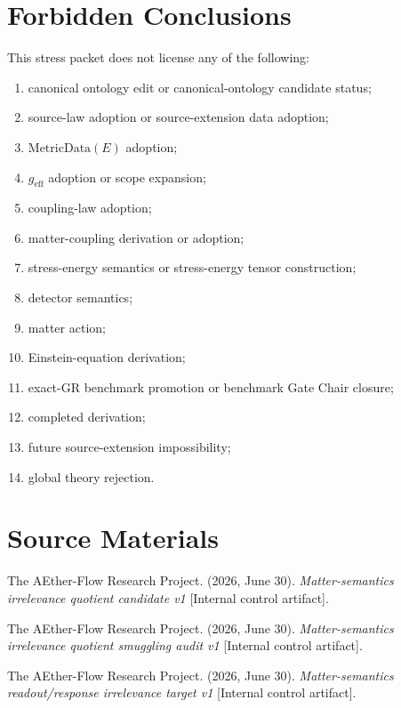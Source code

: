 \section{Forbidden Conclusions}

This stress packet does not license any of the following:
\begin{enumerate}
  \item canonical ontology edit or canonical-ontology candidate status;
  \item source-law adoption or source-extension data adoption;
  \item \(\mathrm{MetricData}(E)\) adoption;
  \item \(g_{\mathrm{eff}}\) adoption or scope expansion;
  \item coupling-law adoption;
  \item matter-coupling derivation or adoption;
  \item stress-energy semantics or stress-energy tensor construction;
  \item detector semantics;
  \item matter action;
  \item Einstein-equation derivation;
  \item exact-GR benchmark promotion or benchmark Gate Chair closure;
  \item completed derivation;
  \item future source-extension impossibility;
  \item global theory rejection.
\end{enumerate}

\section{Source Materials}

The AEther-Flow Research Project. (2026, June 30). \emph{Matter-semantics
irrelevance quotient candidate v1} [Internal control artifact].

The AEther-Flow Research Project. (2026, June 30). \emph{Matter-semantics
irrelevance quotient smuggling audit v1} [Internal control artifact].

The AEther-Flow Research Project. (2026, June 30). \emph{Matter-semantics
readout/response irrelevance target v1} [Internal control artifact].
